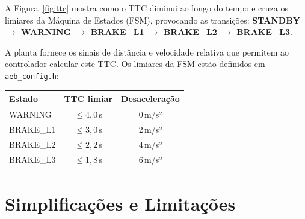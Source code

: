 \documentclass[12pt,a4paper]{article}
\begin{document}
A Figura~\ref{fig:ttc} mostra como o TTC diminui ao longo do tempo e cruza os limiares
da Máquina de Estados (FSM), provocando as transições:
\textbf{STANDBY $\to$ WARNING $\to$ BRAKE\_L1 $\to$ BRAKE\_L2 $\to$ BRAKE\_L3}.

A planta fornece os sinais de distância e velocidade relativa que permitem ao controlador
calcular este TTC. Os limiares da FSM estão definidos em \texttt{aeb\_config.h}:

\begin{table}[H]
  \centering
  \begin{tabular}{lcc}
    \toprule
    \rowcolor{azulescuro!90}
    \color{white}\textbf{Estado} & \color{white}\textbf{TTC limiar} & \color{white}\textbf{Desaceleração} \\
    \midrule
    WARNING    & $\leq 4{,}0$\,s & 0\,m/s² \\
    \rowcolor{azulclaro!50}
    BRAKE\_L1  & $\leq 3{,}0$\,s & 2\,m/s² \\
    BRAKE\_L2  & $\leq 2{,}2$\,s & 4\,m/s² \\
    \rowcolor{azulclaro!50}
    BRAKE\_L3  & $\leq 1{,}8$\,s & 6\,m/s² \\
    \bottomrule
  \end{tabular}
\end{table}

\section{Simplificações e Limitações}
\label{sec:simplif}
\end{document}
